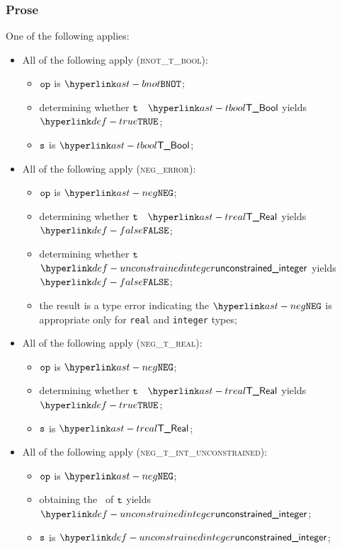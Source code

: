 \subsubsection{Prose}
One of the following applies:
\begin{itemize}
\item All of the following apply (\textsc{bnot\_t\_bool}):
  \begin{itemize}
    \item $\texttt{op}$ is $\BNOT$;
    \item determining whether $\texttt{t}$ \typesatisfies\ $\TBool$ yields $\True$\ProseOrTypeError;
    \item $\texttt{s}$ is $\TBool$;
  \end{itemize}

\item All of the following apply (\textsc{neg\_error}):
\begin{itemize}
  \item $\texttt{op}$ is $\NEG$;
  \item determining whether $\texttt{t}$ \typesatisfies\ $\TReal$ yields $\False$\ProseOrTypeError;
  \item determining whether $\texttt{t}$ \typesatisfies\ $\unconstrainedinteger$ yields $\False$\ProseOrTypeError;
  \item the result is a type error indicating the $\NEG$ is appropriate only for \texttt{real} and \texttt{integer} types;
\end{itemize}

\item All of the following apply (\textsc{neg\_t\_real}):
\begin{itemize}
  \item $\texttt{op}$ is $\NEG$;
  \item determining whether $\texttt{t}$ \typesatisfies\ $\TReal$ yields $\True$;
  \item $\texttt{s}$ is $\TReal$;
\end{itemize}

\item All of the following apply (\textsc{neg\_t\_int\_unconstrained}):
\begin{itemize}
  \item $\texttt{op}$ is $\NEG$;
  \item obtaining the \wellconstrainedstructure\ of $\texttt{t}$ yields $\unconstrainedinteger$\ProseOrTypeError;
  \item $\texttt{s}$ is $\unconstrainedinteger$;
\end{itemize}


\end{itemize}
